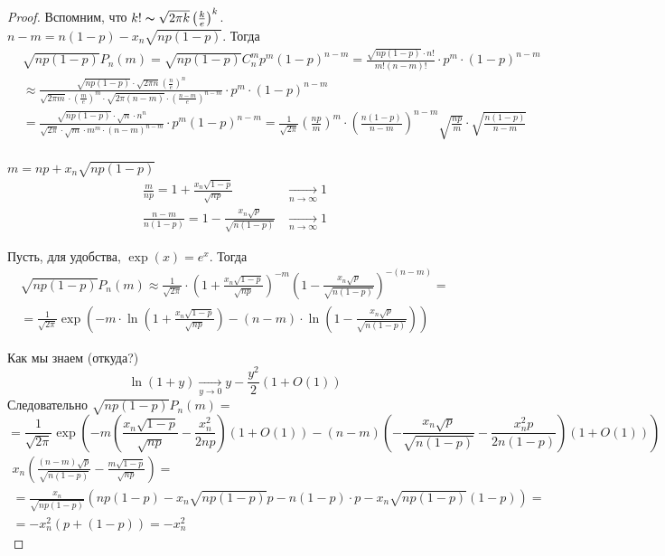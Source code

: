 \documentclass[12pt]{article}
\theoremstyle{definition} %
\theoremstyle{plain} %
\theoremstyle{remark} %
\begin{document}
\begin{proof}
    Вспомним, что $k! \thicksim \sqrt{2\pi k} \left(\frac{k}{e}\right)^k$. \\
    $n - m = n(1 - p) - x_n\sqrt{np(1 - p)}$. Тогда
    \begin{align*}
        &\sqrt{np(1 - p)}P_n(m) = \sqrt{np(1 - p)} C_n^m p^m (1 - p)^{n - m} = \frac{\sqrt{np(1 - p)} \cdot n!}{m!(n - m)!} \cdot p^m \cdot (1 - p)^{n - m} \\
        &\approx \frac{\sqrt{np(1 - p)} \cdot \sqrt{2\pi n} \left(\frac{n}{e}\right)^n}{\sqrt{2\pi m} \cdot \left(\frac{m}{e}\right)^m \cdot \sqrt{2\pi (n - m)} \cdot \left( \frac{n - m}{e}\right)^{n - m}} \cdot p^m \cdot (1 - p)^{n - m} \\
        &= \frac{\sqrt{np(1 - p)} \cdot \sqrt{n} \cdot n^n}{\sqrt{2\pi} \cdot \sqrt{m} \cdot m^m \cdot (n - m)^{n - m}} \cdot p^m (1 - p)^{n - m} = \frac{1}{\sqrt{2\pi}} \left( \frac{np}{m}\right)^m \cdot \left( \frac{n(1 - p)}{n - m}\right)^{n - m} \sqrt{ \frac{np}{m}} \cdot \sqrt{ \frac{n(1 - p)}{n - m}}\\
    \end{align*} 

    $m = np + x_n\sqrt{np(1 - p)}$
    \begin{align*}
        \frac{m}{np} = 1 + \frac{x_n\sqrt{1 - p}}{\sqrt{np}} &\xrightarrow[n \to \infty]{} 1 \\
        \frac{n - m}{n(1 - p)} = 1 - \frac{x_n\sqrt{p}}{\sqrt{n(1 - p)}} &\xrightarrow[n \to \infty]{} 1
    \end{align*} 

    Пусть, для удобства, $\exp(x) = e^x$. Тогда 
    \begin{gather*}
        \sqrt{np(1 - p)}P_n(m) \approx \frac{1}{\sqrt{2\pi}} \cdot \left(1 + \frac{x_n\sqrt{1 - p}}{\sqrt{np}}\right)^{-m} \left(1 - \frac{x_n\sqrt{p}}{\sqrt{n(1 - p)}}\right)^{-(n - m)} = \\
        = \frac{1}{\sqrt{2\pi}} \exp\left({-m \cdot \ln \left(1 + \frac{x_n\sqrt{1 - p}}{\sqrt{np}}\right) - (n - m) \cdot \ln \left(1 - \frac{x_n\sqrt{p}}{\sqrt{n(1 - p)}}\right)}\right)
    \end{gather*}

    Как мы знаем (откуда?)
    \[\ln(1 + y) \xrightarrow[y \to 0]{}y - \frac{y^2}{2}(1 + O(1))\]
    Следовательно $\sqrt{np(1 - p)}P_n(m) =$ 
    \[
        = \frac{1}{\sqrt{2\pi}} \exp \left(-m \left( \frac{x_n \sqrt{1 - p}}{\sqrt{np}} - \frac{x_n^2}{2np}\right)(1 + O(1)) - (n - m)\left(- \frac{x_n\sqrt{p}}{\sqrt{n(1 - p)}} - \frac{x_n^2p}{2n(1 - p)}\right)(1 + O(1))\right)
    \]
    \begin{gather*}
        x_n \left( \frac{(n - m)\sqrt{p}}{\sqrt{n(1 - p)}} - \frac{m\sqrt{1 - p}}{\sqrt{np}}\right) = \\
        = \frac{x_n}{\sqrt{np(1 - p)}}\left(np(1 - p) - x_n\sqrt{np(1 - p)} p - n(1 - p)\cdot p - x_n\sqrt{np(1 - p)}(1 - p)\right) = \\
        = -x_n^2 (p + (1 - p)) = -x_n^2
    \end{gather*}


\end{proof}
\end{document}
